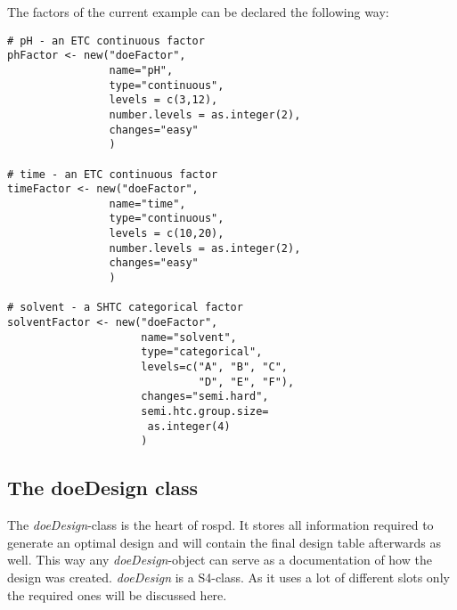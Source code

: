 The factors of the current example can be declared the following way:

\begin{verbatim}
# pH - an ETC continuous factor
phFactor <- new("doeFactor",
                name="pH",
                type="continuous",
                levels = c(3,12),
                number.levels = as.integer(2),
                changes="easy"
                )

# time - an ETC continuous factor
timeFactor <- new("doeFactor",
                name="time",
                type="continuous",
                levels = c(10,20),
                number.levels = as.integer(2),
                changes="easy"
                )

# solvent - a SHTC categorical factor
solventFactor <- new("doeFactor",
                     name="solvent",
                     type="categorical",
                     levels=c("A", "B", "C",
                     		  "D", "E", "F"),
                     changes="semi.hard",
                     semi.htc.group.size=
                      as.integer(4)
                     )
\end{verbatim}

\subsection{ The doeDesign class}

The \textit{doeDesign}-class is the heart of rospd. It stores all information required to generate an optimal design and will contain the final design table afterwards as well. This way any \textit{doeDesign}-object can serve as a documentation of how the design was created. \textit{doeDesign} is a S4-class. As it uses a lot of different slots only the required ones will be discussed here.

